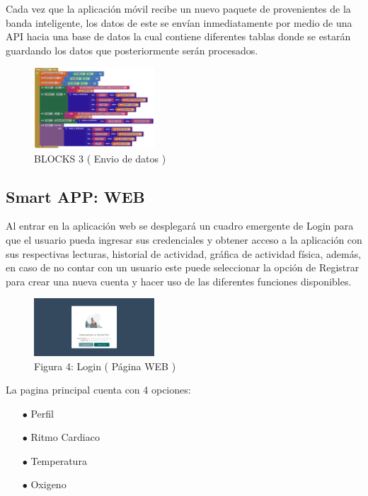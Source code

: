 \documentclass[osajnl,twocolumn,showpacs,superscriptaddress,10pt]{revtex4-1}
\begin{document}
    Cada vez que la aplicación móvil recibe un nuevo paquete de provenientes de la banda inteligente, los datos de este se envían inmediatamente por medio de una API hacia una base de datos la cual contiene diferentes tablas donde se estarán guardando los datos que posteriormente serán procesados.
    
\begin{figure} [H] \centering 
\caption{BLOCKS 3 ( Envio de datos )}
\includegraphics[width=0.4\textwidth]{EviarDatos.PNG} 
\end{figure}
\subsection{Smart APP: WEB}

    Al entrar en la aplicación web se desplegará un cuadro emergente de Login para que el usuario pueda ingresar sus credenciales y obtener acceso a la aplicación con sus respectivas lecturas, historial de actividad, gráfica de actividad física, además, en caso de no contar con un usuario este puede seleccionar la opción de Registrar para crear una nueva cuenta y hacer uso de las diferentes funciones disponibles.
    
\begin{figure} [H] \centering 
\caption{Figura 4: Login ( Página WEB )}
\includegraphics[width=0.4\textwidth]{Login.PNG}
\end{figure}

La pagina principal cuenta con 4 opciones:
\begin{itemize}
    \item[$\bullet$]Perfil 
    \item[$\bullet$]Ritmo Cardiaco
    \item[$\bullet$]Temperatura
    \item[$\bullet$]Oxigeno
\end{itemize}
\end{document}
